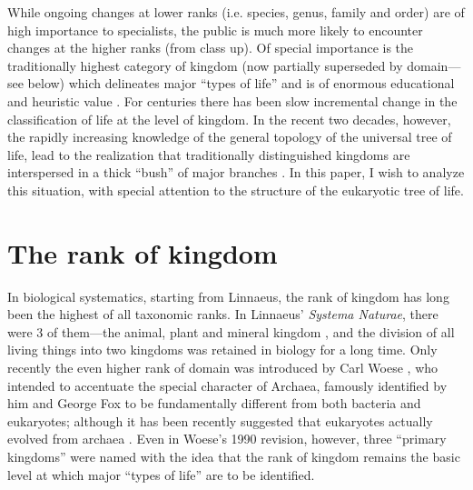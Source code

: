 \begin{artengenv}
While ongoing changes at lower ranks (i.e. species, genus, family and order) are of high importance to specialists, the
public is much more likely to encounter changes at the higher ranks (from class up). Of special importance is the
traditionally highest category of kingdom (now partially superseded by domain---see below) which delineates major
``types of life'' and is of enormous educational and heuristic value
\parencite{copeland_kingdoms_1938,cavalier-smith_eukaryote_1981}.
For centuries there has been slow incremental change in the classification of life at the level
of kingdom. In the recent two decades, however, the rapidly increasing knowledge of the general topology of the
universal tree of life, lead to the realization that traditionally distinguished kingdoms are interspersed in a thick
``bush'' of major branches
\parencite[see e.g.][]{baldauf_kingdom-level_2000}.
In this paper, I wish to analyze
this situation, with special attention to the structure of the eukaryotic tree of life. 

\section{The rank of kingdom}

In biological systematics, starting from Linnaeus, the rank of kingdom has long been the highest of all taxonomic ranks.
In Linnaeus’ \textit{Systema Naturae}, there were 3 of them---the animal, plant and mineral kingdom
\parencite{linnaeus_systema_1788},
and the division of all living things into two kingdoms was retained in
biology for a long time. Only recently the even higher rank of domain was introduced by Carl Woese
\parencite{woese_towards_1990},
who intended to accentuate the special character of
Archaea, famously identified by him and George Fox
\parencite{woese_phylogenetic_1977}
to be fundamentally
different from both bacteria and eukaryotes; although it has been recently suggested that eukaryotes actually evolved
from archaea
\parencite{williams_archaeal_2013}.
Even in Woese’s 1990 revision, however, three ``primary
kingdoms'' were named with the idea that the rank of kingdom remains the basic level at which major ``types of life'' are
to be identified.


\end{artengenv}
